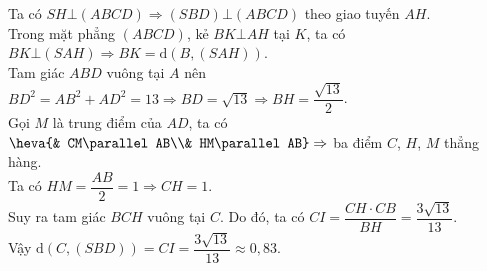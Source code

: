 \begin{ex}
{\begin{center}
        \end{center}
        Ta có $SH \bot \left(ABCD\right) \Rightarrow \left(SBD\right) \bot \left(ABCD\right)$ theo giao tuyến $AH$.\\
        Trong mặt phẳng $\left(ABCD\right)$, kẻ $BK\bot AH$ tại $K$, ta có \\
        $BK\bot \left(SAH\right)\Rightarrow BK=\mathrm{d}\left(B,\left(SAH\right) \right)$.\\
        Tam giác $ABD$ vuông tại $A$ nên $BD^2=AB^2+AD^2=13\Rightarrow BD=\sqrt{13}\Rightarrow BH=\dfrac{\sqrt{13}}{2}$.\\
        Gọi $M$ là trung điểm của $AD$, ta có $\heva{& CM\parallel AB\\& HM\parallel AB}\Rightarrow$ ba điểm $C$, $H$, $M$ thẳng hàng.\\
        Ta có $HM=\dfrac{AB}{2}=1\Rightarrow CH=1$.\\
        Suy ra tam giác $BCH$ vuông tại $C$. Do đó, ta có
        $CI=\dfrac{CH \cdot CB}{BH}=\dfrac{3\sqrt{13}}{13}$.\\
        Vậy $\mathrm{d}\left(C,\left(SBD\right) \right)=CI=\dfrac{3\sqrt{13}}{13}\approx 0{,}83$.}
\end{ex}


